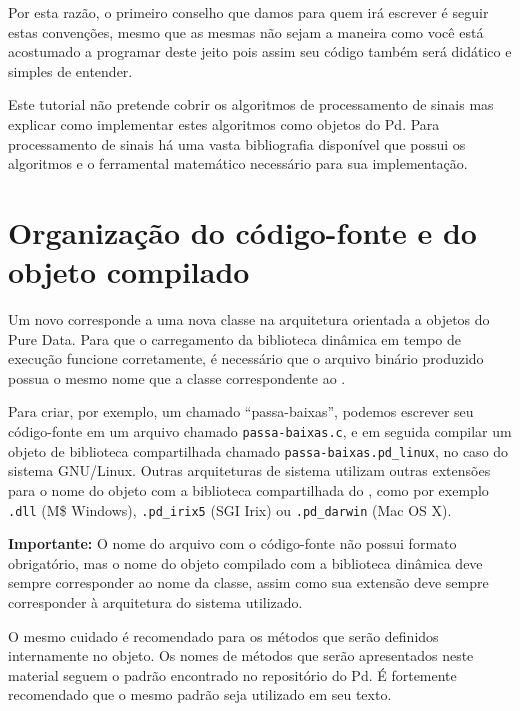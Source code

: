 Por esta razão, o primeiro conselho que damos para quem irá escrever \externals é seguir
estas convenções, mesmo que as mesmas não sejam a maneira como você está acostumado a 
programar deste jeito pois assim seu código também será didático e simples de entender.

Este tutorial não pretende cobrir os algoritmos de processamento de sinais mas explicar
como implementar estes algoritmos como objetos do Pd. Para processamento de sinais há
uma vasta bibliografia disponível que possui os algoritmos e o ferramental matemático
necessário para sua implementação.


\section{Organização do código-fonte e do objeto compilado}
\label{sec:organizacao}

Um novo \external corresponde a uma nova classe na arquitetura orientada a
objetos do Pure Data. Para que o carregamento da biblioteca dinâmica
em tempo de execução funcione corretamente, é necessário que o
arquivo binário produzido possua o mesmo nome que a classe correspondente ao
\external.

Para criar, por exemplo, um \external chamado ``passa-baixas'', podemos
escrever seu código-fonte em um arquivo chamado \texttt{passa-baixas.c}, e em
seguida compilar um objeto de biblioteca compartilhada chamado
\texttt{passa-baixas.pd\_linux}, no caso do sistema GNU/Linux.
Outras arquiteturas de sistema utilizam outras extensões para o nome do objeto com a
biblioteca compartilhada do \external, como por exemplo \texttt{.dll} (M\$
Windows), \texttt{.pd\_irix5} (SGI Irix) ou \texttt{.pd\_darwin} (Mac OS X).

\textbf{Importante:} O nome do arquivo com o código-fonte não possui formato
obrigatório, mas o nome do objeto compilado com a biblioteca dinâmica deve
sempre corresponder ao nome da classe, assim como sua extensão deve sempre
corresponder à arquitetura do sistema utilizado.

O mesmo cuidado é recomendado para os métodos que serão definidos internamente
no objeto. Os nomes de métodos que serão apresentados neste material seguem o padrão
encontrado no repositório do Pd.
É fortemente recomendado que o mesmo padrão seja
utilizado em seu texto.

